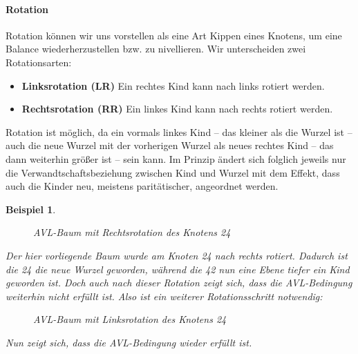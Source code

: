 \documentclass[11pt,a4paper]{scrartcl}
\newtheorem{example}{Beispiel}
\begin{document}
\paragraph{Rotation}
Rotation können wir uns vorstellen als eine Art {\glqq}Kippen{\grqq} eines Knotens, um eine Balance wiederherzustellen bzw. zu nivellieren. Wir unterscheiden zwei Rotationsarten:
\begin{itemize}
\item \textbf{Linksrotation (LR)} Ein rechtes Kind kann nach links rotiert werden.
\item \textbf{Rechtsrotation (RR)} Ein linkes Kind kann nach rechts rotiert werden.
\end{itemize}
Rotation ist möglich, da ein vormals linkes Kind -- das kleiner als die Wurzel ist -- auch die neue Wurzel mit der vorherigen Wurzel als neues rechtes Kind -- das dann weiterhin größer ist -- sein kann. Im Prinzip ändert sich folglich jeweils nur die Verwandtschaftsbeziehung zwischen Kind und Wurzel mit dem Effekt, dass auch die Kinder neu, meistens paritätischer, angeordnet werden.
\begin{example}
\begin{figure}[h!]
\caption{AVL-Baum mit Rechtsrotation des Knotens 24}
\end{figure}
Der hier vorliegende Baum wurde am Knoten 24 nach rechts rotiert. Dadurch ist die 24 die neue Wurzel geworden, während die 42 nun eine Ebene tiefer ein Kind geworden ist. Doch auch nach dieser Rotation zeigt sich, dass die AVL-Bedingung weiterhin nicht erfüllt ist. Also ist ein weiterer Rotationsschritt notwendig:
\begin{figure}[h!]
\caption{AVL-Baum mit Linksrotation des Knotens 24}
\end{figure}
Nun zeigt sich, dass die AVL-Bedingung wieder erfüllt ist.
\end{example}
\end{document}

